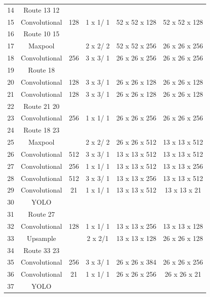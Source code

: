 \documentclass[10pt, letterpaper]{article}
\begin{document}
\begin{table}[h!]
\begin{tabular}{c c c c c c}
            14 & Route 13 12				\\
            15 & Convolutional & 128 & 1 x 1/ 1 & 52 x 52 x 128 & 52 x 52 x 128\\
            16 & Route 10 15				\\
            17 & Maxpool & {} & 2 x 2/ 2 & 52 x 52 x 256 & 26 x 26 x 256\\
            18 & Convolutional & 256 & 3 x 3/ 1 & 26 x 26 x 256 & 26 x 26 x 256\\
            19 & Route 18				\\
            20 & Convolutional & 128 & 3 x 3/ 1 & 26 x 26 x 128 & 26 x 26 x 128\\
            21 & Convolutional & 128 & 3 x 3/ 1 & 26 x 26 x 128 & 26 x 26 x 128\\
            22 & Route 21 20				\\
            23 & Convolutional & 256 & 1 x 1/ 1 & 26 x 26 x 256 & 26 x 26 x 256\\
            24 & Route 18 23				\\
            25 & Maxpool & {} & 2 x 2/ 2 & 26 x 26 x 512 & 13 x 13 x 512\\
            26 & Convolutional & 512 & 3 x 3/ 1 & 13 x 13 x 512 & 13 x 13 x 512\\
            27 & Convolutional & 256 & 1 x 1/ 1 & 13 x 13 x 512 & 13 x 13 x 256\\
            28 & Convolutional & 512 & 3 x 3/ 1 & 13 x 13 x 256 & 13 x 13 x 512\\
            29 & Convolutional & 21 & 1 x 1/ 1 & 13 x 13 x 512 & 13 x 13 x 21\\
            30 & YOLO				\\
            31 & Route 27				\\
            32 & Convolutional & 128 & 1 x 1/ 1 & 13 x 13 x 256 & 13 x 13 x 128\\
            33 & Upsample & {} & 2 x 2/1 & 13 x 13 x 128 & 26 x 26 x 128\\
            34 & Route 33 23				\\
            35 & Convolutional & 256 & 3 x 3/ 1 & 26 x 26 x 384 & 26 x 26 x 256\\
            36 & Convolutional & 21 & 1 x 1/ 1 & 26 x 26 x 256 & 26 x 26 x 21\\
            37 & YOLO				\\
            \hline
        \end{tabular}
    \end{table}  
\end{document}
